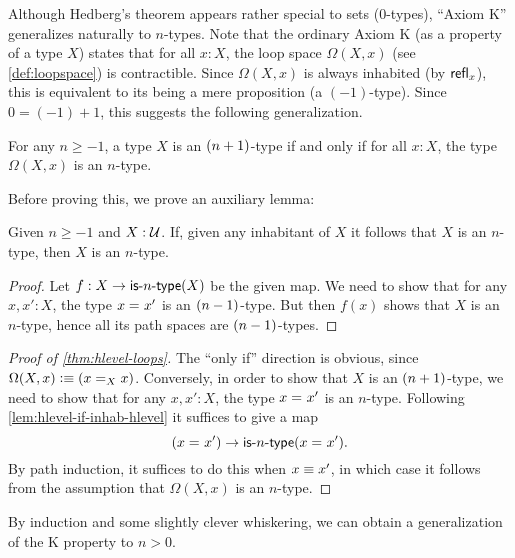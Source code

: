 %

%
Although Hedberg's theorem appears rather special to sets ($0$-types), ``Axiom K'' generalizes naturally to $n$-types.
Note that the ordinary Axiom K (as a property of a type $X$) states that for all $x:X$, the loop space $\Omega(X,x)$ (see \cref{def:loopspace}) is contractible.
Since $\Omega(X,x)$ is always inhabited (by $\refl{x}$), this is equivalent to its being a mere proposition (a $(-1)$-type).
Since $0 = (-1)+1$, this suggests the following generalization.

\begin{thm}\label{thm:hlevel-loops}
  For any $n\geq -1$, a type $X$ is an $\nplusone$-type if and only if for all $x : X$, the type $\Omega(X, x)$ is an $n$-type.
\end{thm}

Before proving this, we prove an auxiliary lemma:

\begin{lem}\label{lem:hlevel-if-inhab-hlevel}
  Given $n \geq -1$ and $X : \type$.
  If, given any inhabitant of $X$ it follows that $X$ is an $n$-type, then $X$ is an $n$-type.
\end{lem}
\begin{proof}
  Let $f : X \to \istype{n}(X)$ be the given map.
  We need to show that for any $x, x' : X$, the type $\id{x}{x'}$ is an $\nminusone$-type.
  But then $f(x)$ shows that $X$ is an $n$-type, hence all its path spaces are $\nminusone$-types.
\end{proof}

\begin{proof}[Proof of \autoref{thm:hlevel-loops}]
  The ``only if'' direction is obvious, since $\Omega(X,x)\defeq (\id[X]xx)$.
  Conversely, in order to show that $X$ is an $\nplusone$-type, we need to show that for any $x, x' : X$, the type $\id{x}{x'}$ is an
$n$-type.
  Following \autoref{lem:hlevel-if-inhab-hlevel} it suffices to give a map
  \[ (\id{x}{x'}) \to \istype{n}(\id{x}{x'}). \]
  By path induction, it suffices to do this when $x\jdeq x'$, in which case it follows from the assumption that $\Omega(X, x)$ is an
$n$-type.
\end{proof}

By induction and some slightly clever whiskering, we can obtain a generalization of the K property to $n>0$.

